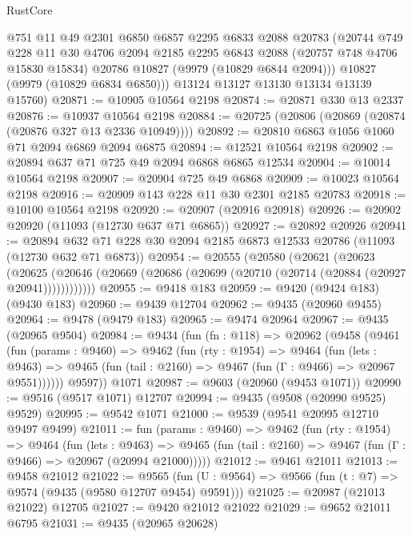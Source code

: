 \begin{lexlean}{RustCore}
\begin{coremodule}
        @751
        @11
        @49
        @2301
        @6850
        @6857
        @2295
        @6833
        @2088
        @20783
        (@20744
          @749
          @228
          @11
          @30
          @4706
          @2094
          @2185
          @2295
          @6843
          @2088
          (@20757 @748 @4706 @15830 @15834)
          @20786
          @10827
          (@9979 (@10829 @6844 @2094)))
        @10827
        (@9979 (@10829 @6834 @6850)))
      @13124
      @13127
      @13130
      @13134
      @13139
      @15760)
@20871 := @10905 @10564 @2198
@20874 := @20871 @330 @13 @2337
@20876 := @10937 @10564 @2198
@20884 := @20725 (@20806 (@20869 (@20874 (@20876 @327 @13 @2336 @10949))))
@20892 := @20810 @6863 @1056 @1060 @71 @2094 @6869 @2094 @6875
@20894 := @12521 @10564 @2198
@20902 := @20894 @637 @71 @725 @49 @2094 @6868 @6865 @12534
@20904 := @10014 @10564 @2198
@20907 := @20904 @725 @49 @6868
@20909 := @10023 @10564 @2198
@20916 := @20909 @143 @228 @11 @30 @2301 @2185 @20783
@20918 := @10100 @10564 @2198
@20920 := @20907 (@20916 @20918)
@20926 := @20902 @20920 (@11093 (@12730 @637 @71 @6865))
@20927 := @20892 @20926
@20941 := @20894 @632 @71 @228 @30 @2094 @2185 @6873 @12533 @20786 (@11093 (@12730 @632 @71 @6873))
@20954 := @20555
    (@20580
      (@20621
        (@20623
          (@20625 (@20646 (@20669 (@20686 (@20699 (@20710 (@20714 (@20884 (@20927 @20941))))))))))))
@20955 := @9418 @183
@20959 := @9420 (@9424 @183) (@9430 @183)
@20960 := @9439 @12704
@20962 := @9435 (@20960 @9455)
@20964 := @9478 (@9479 @183)
@20965 := @9474 @20964
@20967 := @9435 (@20965 @9504)
@20984 := @9434
    (fun (fn : @118) =>
    @20962
      (@9458
        (@9461
          (fun (params : @9460) =>
          @9462
            (fun (rty : @1954) =>
            @9464
              (fun (lets : @9463) =>
              @9465 (fun (tail : @2160) => @9467 (fun (Γ : @9466) => @20967 @9551))))))
        @9597))
    @1071
@20987 := @9603 (@20960 (@9453 @1071))
@20990 := @9516 (@9517 @1071) @12707
@20994 := @9435 (@9508 (@20990 @9525) @9529)
@20995 := @9542 @1071
@21000 := @9539 (@9541 @20995 @12710 @9497 @9499)
@21011 := fun (params : @9460) =>
  @9462
    (fun (rty : @1954) =>
    @9464
      (fun (lets : @9463) =>
      @9465 (fun (tail : @2160) => @9467 (fun (Γ : @9466) => @20967 (@20994 @21000)))))
@21012 := @9461 @21011
@21013 := @9458 @21012
@21022 := @9565
    (fun (U : @9564) => @9566 (fun (t : @7) => @9574 (@9435 (@9580 @12707 @9454) @9591)))
@21025 := @20987 (@21013 @21022) @12705
@21027 := @9420 @21012 @21022
@21029 := @9652 @21011 @6795
@21031 := @9435 (@20965 @20628)

\end{coremodule}
\end{lexlean}
